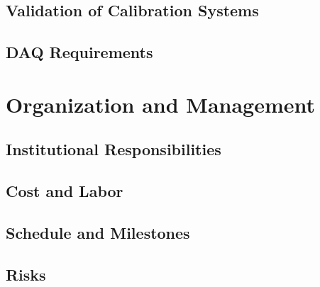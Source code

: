 
\subsection{Validation of Calibration Systems}
\label{sec:dp-calib-val}


\subsection{DAQ Requirements}
\label{sec:dp-calib-daqreq}

\section{Organization and Management}
\label{sec:dp-calib-org}

\subsection{Institutional Responsibilities}
\label{sec:dp-calib-resp}

\subsection{Cost and Labor}
\label{sec:dp-calib-cost}

\subsection{Schedule and Milestones}
\label{sec:dp-calib-sched}

\subsection{Risks}
\label{sec:dp-calib-risks}

